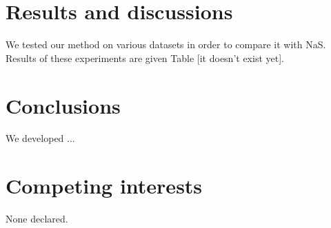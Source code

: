 \documentclass[twoside,twocolumn]{article}
\begin{document}
\section{Results and discussions}

We tested our method on various datasets in order to compare it with NaS. Results of these experiments are given Table [it doesn't exist yet].

\section{Conclusions}

We developed ...

\section{Competing interests}

None declared.






\end{document}
